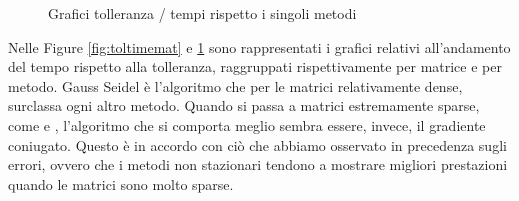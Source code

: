 \begin{figure}%
	\centering
	\qquad
	\caption{Grafici tolleranza / tempi rispetto i singoli metodi}%
	\label{fig:toltimemet}
\end{figure}

Nelle Figure \ref{fig:toltimemat} e \ref{fig:toltimemet} sono rappresentati i grafici relativi all'andamento del tempo rispetto alla tolleranza, raggruppati rispettivamente per matrice e per metodo.
Gauss Seidel è l'algoritmo che per le matrici relativamente dense, surclassa ogni altro metodo. Quando si passa a matrici estremamente sparse, come  e , l'algoritmo che si comporta meglio sembra essere, invece, il gradiente coniugato. Questo è in accordo con ciò che abbiamo osservato in precedenza sugli errori, ovvero che i metodi non stazionari tendono a mostrare migliori prestazioni quando le matrici sono molto sparse.

